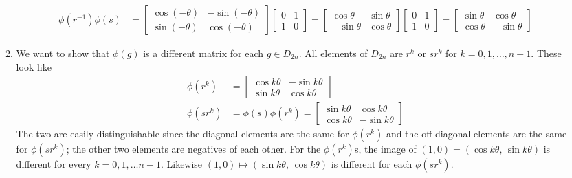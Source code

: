 \documentclass[]{article}
\begin{document}
\begin{enumerate}
\begin{enumerate}
\begin{align}
\phi(r^{-1})\phi(s) &= \begin{bmatrix}\cos(-\theta) & -\sin(-\theta) \\ \sin(-\theta) & \cos(-\theta)\end{bmatrix}\begin{bmatrix}0&1\\1&0\end{bmatrix} = \begin{bmatrix}\cos\theta & \sin\theta \\ -\sin\theta & \cos\theta\end{bmatrix}\begin{bmatrix}0&1\\1&0\end{bmatrix} = \begin{bmatrix}\sin\theta & \cos\theta \\ \cos\theta & -\sin\theta\end{bmatrix}
\end{align}
\item We want to show that $\phi(g)$ is a different matrix for each $g \in D_{2n}$. All elements of $D_{2n}$ are $r^k$ or $sr^k$ for $k = 0,1,\ldots,n-1$. These look like
\begin{align}
\phi(r^k) &= \begin{bmatrix}\cos k\theta & -\sin k\theta \\ \sin k\theta & \cos k\theta\end{bmatrix} \\
\phi(sr^k) &= \phi(s)\phi(r^k) = \begin{bmatrix}\sin k\theta & \cos k\theta \\ \cos k\theta & -\sin k\theta\end{bmatrix}
\end{align}
The two are easily distinguishable since the diagonal elements are the same for $\phi(r^k)$ and the off-diagonal elements are the same for $\phi(sr^k)$; the other two elements are negatives of each other. For the $\phi(r^k)$s, the image of $(1,0) = (\cos k\theta,\, \sin k\theta)$ is different for every $k=0,1,\ldots n-1$. Likewise $(1,0) \mapsto (\sin k\theta,\, \cos k\theta)$ is different for each $\phi(sr^k)$.
\end{enumerate}




\end{enumerate}
\end{document}
